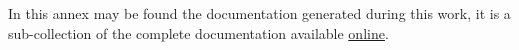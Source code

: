 
In this annex may be found the documentation generated during this work, it is
a sub-collection of the complete documentation available 
\href{https://fda.readthedocs.io/en/latest/}{online}.



